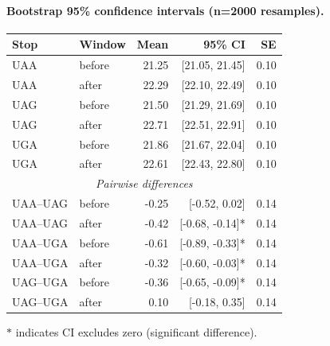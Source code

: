 \paragraph{Bootstrap 95\% confidence intervals (n=2000 resamples).}
\begin{center}\small
\begin{tabular}{llrrr}\toprule
Stop & Window & Mean & 95\% CI & SE \\\midrule
UAA & before & 21.25 & [21.05, 21.45] & 0.10 \\
UAA & after & 22.29 & [22.10, 22.49] & 0.10 \\
UAG & before & 21.50 & [21.29, 21.69] & 0.10 \\
UAG & after & 22.71 & [22.51, 22.91] & 0.10 \\
UGA & before & 21.86 & [21.67, 22.04] & 0.10 \\
UGA & after & 22.61 & [22.43, 22.80] & 0.10 \\
\midrule
\multicolumn{5}{c}{\textit{Pairwise differences}} \\\midrule
UAA--UAG & before & -0.25 & [-0.52, 0.02] & 0.14 \\
UAA--UAG & after & -0.42 & [-0.68, -0.14]* & 0.14 \\
UAA--UGA & before & -0.61 & [-0.89, -0.33]* & 0.14 \\
UAA--UGA & after & -0.32 & [-0.60, -0.03]* & 0.14 \\
UAG--UGA & before & -0.36 & [-0.65, -0.09]* & 0.14 \\
UAG--UGA & after & 0.10 & [-0.18, 0.35] & 0.14 \\
\bottomrule
\end{tabular}
\end{center}
\footnotesize $*$ indicates CI excludes zero (significant difference).
